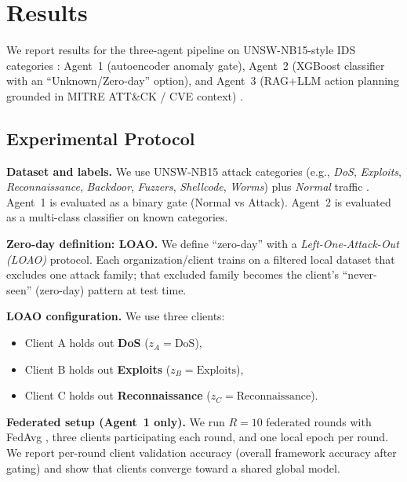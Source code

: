 
\section{Results}
\label{sec:results}

We report results for the three-agent pipeline on UNSW-NB15-style IDS categories \cite{moustafa2015unsw}: Agent~1 (autoencoder anomaly gate), Agent~2 (XGBoost classifier with an ``Unknown/Zero-day'' option), and Agent~3 (RAG+LLM action planning grounded in MITRE ATT\&CK / CVE context) \cite{chen2016xgboost,lewis2020rag,mitreattack}.

\subsection{Experimental Protocol}
\label{sec:protocol}

\textbf{Dataset and labels.} We use UNSW-NB15 attack categories (e.g., \emph{DoS}, \emph{Exploits}, \emph{Reconnaissance}, \emph{Backdoor}, \emph{Fuzzers}, \emph{Shellcode}, \emph{Worms}) plus \emph{Normal} traffic \cite{moustafa2015unsw}. Agent~1 is evaluated as a binary gate (Normal vs Attack). Agent~2 is evaluated as a multi-class classifier on known categories.

\textbf{Zero-day definition: LOAO.} We define ``zero-day'' with a \emph{Left-One-Attack-Out (LOAO)} protocol. Each organization/client trains on a filtered local dataset that excludes one attack family; that excluded family becomes the client’s ``never-seen'' (zero-day) pattern at test time.

\textbf{LOAO configuration.} We use three clients:
\begin{itemize}
  \item Client A holds out \textbf{DoS} ($z_A=\text{DoS}$),
  \item Client B holds out \textbf{Exploits} ($z_B=\text{Exploits}$),
  \item Client C holds out \textbf{Reconnaissance} ($z_C=\text{Reconnaissance}$).
\end{itemize}

\textbf{Federated setup (Agent~1 only).} We run $R=10$ federated rounds with FedAvg \cite{mcmahan2017fedavg}, three clients participating each round, and one local epoch per round. We report per-round client validation accuracy (overall framework accuracy after gating) and show that clients converge toward a shared global model.

